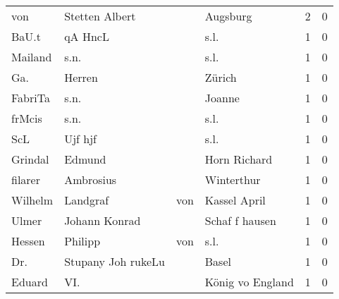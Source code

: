 \documentclass[10pt,a4paper,landscape]{article}
\begin{document}
\begin{longtable}{llllrr}
                      von &                     Stetten Albert &             &                                    Augsburg &          2 &         0 \\
                    BaU.t &                            qA HncL &             &                                        s.l. &          1 &         0 \\
                  Mailand &                               s.n. &             &                                        s.l. &          1 &         0 \\
                      Ga. &                             Herren &             &                                      Zürich &          1 &         0 \\
                  FabriTa &                               s.n. &             &                                      Joanne &          1 &         0 \\
                   frMcis &                               s.n. &             &                                        s.l. &          1 &         0 \\
                      ScL &                            Ujf hjf &             &                                        s.l. &          1 &         0 \\
                  Grindal &                             Edmund &             &                                Horn Richard &          1 &         0 \\
                  filarer &                          Ambrosius &             &                                  Winterthur &          1 &         0 \\
                  Wilhelm &                           Landgraf &         von &                                Kassel April &          1 &         0 \\
                    Ulmer &                      Johann Konrad &             &                              Schaf f hausen &          1 &         0 \\
                   Hessen &                            Philipp &         von &                                        s.l. &          1 &         0 \\
                      Dr. &                 Stupany Joh rukeLu &             &                                       Basel &          1 &         0 \\
                   Eduard &                                VI. &             &                            König vo England &          1 &         0 \\

\end{longtable}
\end{document}
